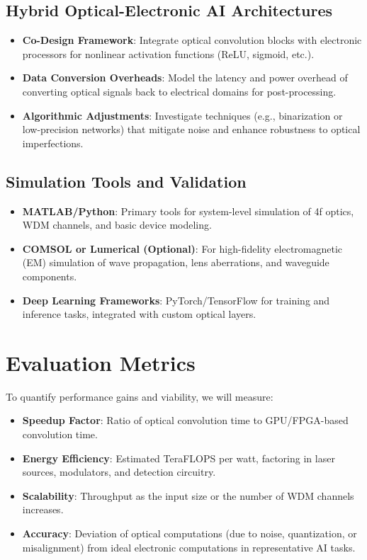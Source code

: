 \documentclass[conference]{IEEEtran}
\begin{document}
\subsection{Hybrid Optical-Electronic AI Architectures}
\begin{itemize}
    \item \textbf{Co-Design Framework}: Integrate optical convolution blocks with electronic processors for nonlinear activation functions (ReLU, sigmoid, etc.).
    \item \textbf{Data Conversion Overheads}: Model the latency and power overhead of converting optical signals back to electrical domains for post-processing.
    \item \textbf{Algorithmic Adjustments}: Investigate techniques (e.g., binarization or low-precision networks) that mitigate noise and enhance robustness to optical imperfections.
\end{itemize}

\subsection{Simulation Tools and Validation}
\begin{itemize}
    \item \textbf{MATLAB/Python}: Primary tools for system-level simulation of 4f optics, WDM channels, and basic device modeling.
    \item \textbf{COMSOL or Lumerical (Optional)}: For high-fidelity electromagnetic (EM) simulation of wave propagation, lens aberrations, and waveguide components.
    \item \textbf{Deep Learning Frameworks}: PyTorch/TensorFlow for training and inference tasks, integrated with custom optical layers.
\end{itemize}

\section{Evaluation Metrics}
To quantify performance gains and viability, we will measure:
\begin{itemize}
    \item \textbf{Speedup Factor}: Ratio of optical convolution time to GPU/FPGA-based convolution time.
    \item \textbf{Energy Efficiency}: Estimated TeraFLOPS per watt, factoring in laser sources, modulators, and detection circuitry.
    \item \textbf{Scalability}: Throughput as the input size or the number of WDM channels increases.
    \item \textbf{Accuracy}: Deviation of optical computations (due to noise, quantization, or misalignment) from ideal electronic computations in representative AI tasks.
\end{itemize}
\end{document}
